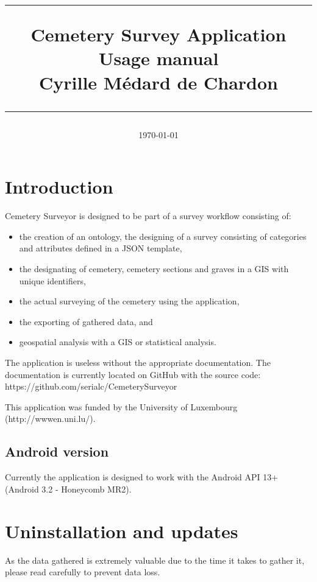 \documentclass{scrreprt}
\title{
\flushright
\rule{16cm}{5pt}\vskip1cm
\Huge{Cemetery Survey Application}\\
\vspace{2cm}
\LARGE{Usage manual \myversion\\}
\vspace{2cm}
Cyrille M\'edard de Chardon\\
\date{\today}
\vfill
\rule{16cm}{5pt}
}
\author{}
\date{}
\def\myversion{1.0}
\begin{document}
\maketitle
\tableofcontents


\chapter{Introduction}
Cemetery Surveyor is designed to be part of a survey workflow consisting of:
\begin{itemize}
\item the creation of an ontology,
 the designing of a survey consisting of categories and attributes defined in a JSON template,
\item the designating of cemetery, cemetery sections and graves in a GIS with unique identifiers,
\item the actual surveying of the cemetery using the application,
\item the exporting of gathered data, and
\item geospatial analysis with a GIS or statistical analysis.
\end{itemize}

The application is useless without the appropriate documentation. The documentation is currently located on GitHub with the source code: https://github.com/serialc/CemeterySurveyor

This application was funded by the University of Luxembourg (http://wwwen.uni.lu/).

\section{Android version}
Currently the application is designed to work with the Android API 13+ (Android 3.2 - Honeycomb MR2).


\chapter{Uninstallation and updates}
As the data gathered is extremely valuable due to the time it takes to gather it, please read carefully to prevent data loss.
\end{document}
